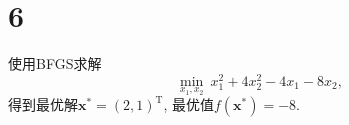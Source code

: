\section*{6}

使用BFGS求解
\begin{equation}
    \min_{x_1,x_2} ~ x_1^2+4x_2^2-4x_1-8x_2,
\end{equation}
得到最优解$\bm{x}^*=(2,1)^\mathrm{T}$, 最优值$f(\bm{x}^*)=-8$.
